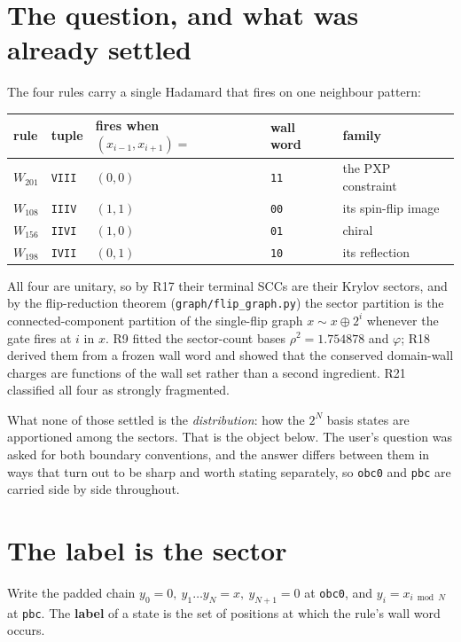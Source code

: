 \documentclass[11pt]{article}
\newcommand{\rt}[1]{\texttt{#1}}
\newcommand{\fn}[1]{\texttt{#1}}
\theoremstyle{plain}
\theoremstyle{remark}
\begin{document}
\tableofcontents

\section{The question, and what was already settled}

The four rules carry a single Hadamard that fires on one neighbour pattern:
\begin{center}
\begin{tabular}{lllll}
\toprule
rule & tuple & fires when $(x_{i-1},x_{i+1})=$ & wall word & family \\
\midrule
$W_{201}$ & \rt{VIII} & $(0,0)$ & \rt{11} & the PXP constraint \\
$W_{108}$ & \rt{IIIV} & $(1,1)$ & \rt{00} & its spin-flip image \\
$W_{156}$ & \rt{IIVI} & $(1,0)$ & \rt{01} & chiral \\
$W_{198}$ & \rt{IVII} & $(0,1)$ & \rt{10} & its reflection \\
\bottomrule
\end{tabular}
\end{center}

\noindent All four are unitary, so by R17 their terminal SCCs are their Krylov
sectors, and by the flip-reduction theorem (\fn{graph/flip\_graph.py}) the
sector partition is the connected-component partition of the single-flip graph
$x \sim x\oplus 2^i$ whenever the gate fires at $i$ in $x$. R9 fitted the
sector-count bases $\rho^2=1.754878$ and $\varphi$; R18 derived them from a
frozen wall word and showed that the conserved domain-wall charges are functions
of the wall set rather than a second ingredient. R21 classified all four as
strongly fragmented.

What none of those settled is the \emph{distribution}: how the $2^N$ basis states
are apportioned among the sectors. That is the object below. The user's question
was asked for both boundary conventions, and the answer differs between them in
ways that turn out to be sharp and worth stating separately, so \rt{obc0} and
\rt{pbc} are carried side by side throughout.

\section{The label is the sector}

Write the padded chain $y_0=0,\ y_1\ldots y_N = x,\ y_{N+1}=0$ at \rt{obc0}, and
$y_i = x_{i\bmod N}$ at \rt{pbc}. The \textbf{label} of a state is the set of
positions at which the rule's wall word occurs.
\end{document}
